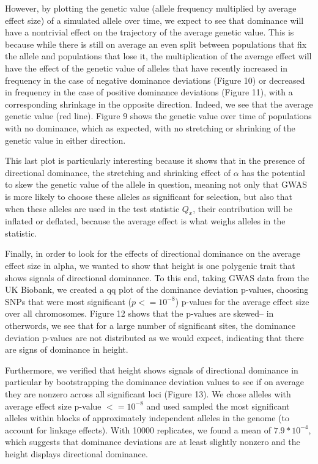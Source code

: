 \documentclass[a4paper,12pt]{article}
\begin{document}
However, by plotting the genetic value (allele frequency multiplied by
average effect size) of a simulated allele over time, we expect to see
that dominance will have a nontrivial effect on the trajectory of the
average genetic value. This is because while there is still on average
an even split between populations that fix the allele and populations
that lose it, the multiplication of the average effect will have the
effect of  the genetic value of alleles that have
recently increased in frequency in the case of negative dominance
deviations (Figure 10) or decreased in frequency in the case of
positive dominance deviations (Figure 11), with a corresponding
shrinkage in the opposite direction. Indeed, we see that the
average genetic value (red line). Figure 9 shows the genetic value
over time of populations with no dominance, which as expected, with no
stretching or shrinking of the genetic value in either direction.

This last plot is particularly interesting because it shows that in
the presence of directional dominance, the stretching and shrinking
effect of $\alpha$ has the potential to skew the genetic value of the
allele in question, meaning not only that GWAS is more likely to
choose these alleles as significant for selection, but also that when
these alleles are used in the test statistic $Q_x$, their contribution
will be inflated or deflated, because the average effect is what
weighs alleles in the statistic.

Finally, in order to look for the effects of directional dominance on
the average effect size in alpha, we wanted to show that height is one
polygenic trait that shows signals of directional dominance. To this
end, taking GWAS data from the UK Biobank, we created a qq plot of the
dominance deviation p-values, choosing SNPs that were 
most significant ($p <= 10^{-8}$) p-values for the average effect size
over all chromosomes. Figure 12 shows that the p-values are skewed--
in otherwords, we see that for a large number of significant sites,
the dominance deviation p-values are not distributed as we would
expect, indicating that there are signs of dominance in height.

Furthermore, we verified that height shows signals of directional
dominance in particular by bootstrapping the dominance deviation
values to see if on average they are nonzero across all
significant loci (Figure 13). We chose alleles with average effect size p-value
$<= 10^{-8}$ and used sampled the most significant alleles within
blocks of approximately independent alleles in the genome (to account
for linkage effects). With 10000 replicates, we found a mean of
$7.9*10^{-4}$, which suggests that dominance deviations are at least
slightly nonzero and the height displays directional dominance.  
\end{document}
